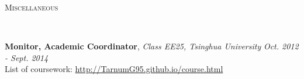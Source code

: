 \documentclass[a4paper, 11pt]{article}
\newenvironment{changemargin}[2]{%
  \begin{list}{}{%
    \setlength{\topsep}{0pt}%
    \setlength{\leftmargin}{#1}%
    \setlength{\rightmargin}{#2}%
    \setlength{\listparindent}{\parindent}%
    \setlength{\itemindent}{\parindent}%
    \setlength{\parsep}{\parskip}%
  }%
  \item[]}{\end{list}
}
\newcommand{\lineover}{
	\begin{changemargin}{-0.05in}{-0.05in}
		\vspace*{-8pt}
		\hrulefill \\
		\vspace*{-2pt}
	\end{changemargin}
}
\newcommand{\header}[1]{
	\begin{changemargin}{-0.5in}{-0.5in}
		\scshape{#1}\\
  	\lineover
	\end{changemargin}
}
\newenvironment{body} {
	\vspace*{-16pt}
	\begin{changemargin}{-0.25in}{-0.5in}
  }	
	{\end{changemargin}
}
\begin{document}
\smallskip






\header{Miscellaneous}

\begin{body}
	\vspace{14pt}
	\textbf {Monitor, Academic Coordinator}, \emph{Class EE25, Tsinghua University} \hfill \emph{Oct. 2012 - Sept. 2014}\\
	\smallskip
	List of coursework: \href{http://tarnumg95.github.io/course.html}{http://TarnumG95.github.io/course.html}\\


\end{body}
\end{document}
